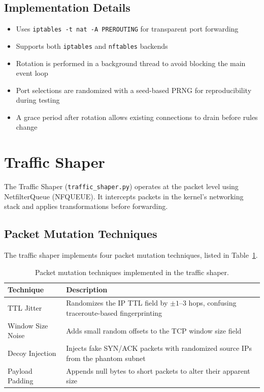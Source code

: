 \subsection{Implementation Details}

\begin{itemize}
    \item Uses \texttt{iptables -t nat -A PREROUTING} for transparent port forwarding
    \item Supports both \texttt{iptables} and \texttt{nftables} backends
    \item Rotation is performed in a background thread to avoid blocking the main event loop
    \item Port selections are randomized with a seed-based PRNG for reproducibility during testing
    \item A grace period after rotation allows existing connections to drain before rules change
\end{itemize}

\section{Traffic Shaper}

The Traffic Shaper (\texttt{traffic\_shaper.py}) operates at the packet level using NetfilterQueue (NFQUEUE). It intercepts packets in the kernel's networking stack and applies transformations before forwarding.

\subsection{Packet Mutation Techniques}

The traffic shaper implements four packet mutation techniques, listed in Table~\ref{tab:mutations}.

\begin{table}[H]
\centering
\caption{Packet mutation techniques implemented in the traffic shaper.}
\label{tab:mutations}
\begin{tabular}{lp{9cm}}
\toprule
\textbf{Technique} & \textbf{Description} \\
\midrule
TTL Jitter & Randomizes the IP TTL field by $\pm 1$--$3$ hops, confusing traceroute-based fingerprinting \\
Window Size Noise & Adds small random offsets to the TCP window size field \\
Decoy Injection & Injects fake SYN/ACK packets with randomized source IPs from the phantom subnet \\
Payload Padding & Appends null bytes to short packets to alter their apparent size \\
\bottomrule
\end{tabular}
\end{table}

